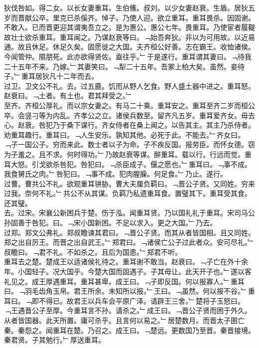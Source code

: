 \documentclass{zhvt-classic}
\begin{document}
\hspace*{2em}狄伐咎如。得二女。以长女妻重耳。生伯鯈。叔刘。以少女妻赵衰。生盾。居狄五岁而晋献公卒。里克已杀傒齐。悼子。乃使人迎。欲立重耳。重耳畏杀。因固谢。不敢入。已而晋更迎其谓夷吾立之。是为惠公。惠公七年。畏重耳。乃使宦者履鞮故壮士欲杀重耳。重耳闻之。乃谋赵衰等曰。﹁始吾奔狄。非以为可用故。以近易通。故且休足。休足久矣。固愿徙之大国。夫齐桓公好善。志在霸王。收恤诸侯。今闻管仲。隰朋死。此亦欲得贤佐。盍往乎。﹂于是遂行。重耳谓其妻曰。﹁待我二十五年不来。乃嫁。﹂其妻笑曰。﹁犁二十五年。吾冢上柏大矣。虽然。妾待子。﹂重耳居狄凡十二年而去。\\
\hspace*{2em}过卫。卫文公不礼。去。过五鹿。饥而从野人乞食。野人盛土器中进之。重耳怒。赵衰曰。﹁土者。有土也。君其拜受之。﹂\\
\hspace*{2em}至齐。齐桓公厚礼。而以宗女妻之。有马二十乘。重耳安之。重耳至齐二岁而桓公卒。会竖刁等为内乱。齐孝公之立。诸侯兵数至。留齐凡五岁。重耳爱齐女。毋去心。赵衰。咎犯乃于桑下谋行。齐女侍者在桑上闻之。以告其主。其主乃杀侍者。劝重耳趣行。重耳曰。﹁人生安乐。孰知其他。必死于此。不能去。﹂齐女曰。﹁子一国公子。穷而来此。数士者以子为命。子不疾反国。报劳臣。而怀女德。窃为子羞之。且不求。何时得功。﹂乃故赵衰等谋。醉重耳。载以行。行远而觉。重耳大怒。引戈欲杀咎犯。咎犯曰。﹁杀臣成子。偃之愿也。﹂重耳曰。﹁事不成。我食舅氏之肉。﹂咎犯曰。﹁事不成。犯肉腥臊。何足食。﹂乃止。遂行。\\
\hspace*{2em}过曹。曹共公不礼。欲观重耳骈胁。曹大夫厘负羁曰。﹁晋公子贤。又同姓。穷来过我。奈何不礼。﹂共公不从其谋。负羁乃私遗重耳食。置璧其下。重耳受其食。还其璧。\\
\hspace*{2em}去。过宋。宋襄公新困兵于楚。伤于泓。闻重耳贤。乃以国礼礼于重耳。宋司马公孙固善于咎犯。曰。﹁宋小国新困。不足以求入。更之大国。﹂乃去。\\
\hspace*{2em}过郑。郑文公弗礼。郑叔瞻谏其君曰。﹁晋公子贤。而其从者皆国相。且又同姓。郑之出自厉王。而晋之出自武王。﹂郑君曰。﹁诸侯亡公子过此者众。安可尽礼。﹂叔瞻曰。﹁君不礼。不如杀之。且后为国患。﹂郑君不听。\\
\hspace*{2em}重耳去之楚。楚成王以适诸侯礼待之。重耳谢不敢当。赵衰曰。﹁子亡在外十余年。小国轻子。况大国乎。今楚大国而固遇子。子其毋让。此天开子也。﹂遂以客礼见之。成王厚遇重耳。重耳甚卑。成王曰。﹁子即反国。何以报寡人。﹂重耳曰。﹁羽毛齿角玉帛。君王所余。未知所以报。﹂王曰。﹁虽然。何以报不谷。﹂重耳曰。﹁即不得已。故君王以兵车会平原广泽。请辟王三舍。﹂楚将子玉怒曰。﹁王遇晋公子至厚。今重耳言不孙。请杀之。﹂成王曰。﹁晋公子贤而困于外久。从者皆国器。此天所置。庸可杀乎。且言何以易之。﹂居楚数月。而晋太子圉亡秦。秦怨之。闻重耳在楚。乃召之。成王曰。﹁楚远。更数国乃至晋。秦晋接境。秦君贤。子其勉行。﹂厚送重耳。\\
\end{document}
